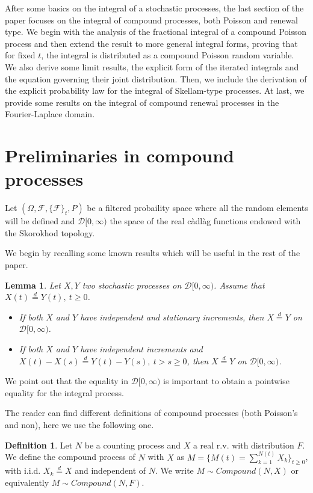 \documentclass[12pt, twoside, english, headsepline]{article}
\newtheorem{lemma}[theorem]{Lemma}
\theoremstyle{definition} %
\newtheorem{definition}{Definition}[section]
\numberwithin{equation}{section} %
\begin{document}
After some basics on the integral of a stochastic processes, the last section 	of the paper focuses on the integral of compound processes, both Poisson and renewal type. We begin with the analysis of the fractional integral of a compound Poisson process and then extend the result to more general integral forms, proving that for fixed $t$, the integral is distributed as a compound Poisson random variable. We also derive some limit results, the explicit form of the iterated integrals and the equation governing their joint distribution. Then, we include the derivation of the explicit probability law for the integral of Skellam-type processes. At last, we provide some results on the integral of compound renewal processes in the Fourier-Laplace domain.




\section{Preliminaries in compound processes}

Let $(\Omega, \mathcal{F}, \{\mathcal{F}\}_t, P)$ be a filtered probaility space where all the random elements will be defined and  $\mathcal{D}[0,\infty)$ the space of the real c\`{a}dl\`{a}g functions endowed with the Skorokhod topology.

We begin by recalling some known results which will be useful in the rest of the paper.
\begin{lemma}\label{lemmaUguaglianzaProcessiSpazioFunzioniCadlag}
	Let $X, Y$ two stochastic processes on $\mathcal{D}[0,\infty)$. Assume that $X(t)\stackrel{d}{=}Y(t), \ t\ge0$. 
	\begin{itemize}
		\item[($i$)] If both $X$ and $Y$ have independent and stationary increments, then $X\stackrel{d}{=}Y$ on $\mathcal{D}[0,\infty)$.
		\item[($ii$)] If both $X$ and $Y$ have independent increments and $X(t)-X(s)\stackrel{d}{=}Y(t)-Y(s), \ t>s\ge0$, then $X\stackrel{d}{=}Y$ on $\mathcal{D}[0,\infty)$.
	\end{itemize} 
\end{lemma}

We point out that the equality in $\mathcal{D}[0,\infty)$ is important to obtain a pointwise equality for the integral process.

The reader can find different definitions of compound processes (both Poisson's and non), here we use the following one.

\begin{definition}
	Let $N$ be a counting process and $X$ a real r.v. with distribution $F$. We define the compound process of $N$ with $X$ as $M=\big\{M(t) = \sum_{k=1}^{N(t)} X_k\big\}_{t\ge0}$, with i.i.d. $X_k \stackrel{d}{=}X$ and independent of $N$. We write $M\sim Compound(N,X)$ or equivalently $M\sim Compound(N,F)$.	
\end{definition}
\end{document}
